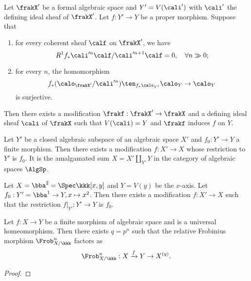     \begin{theorem}\label{thm:Artin_higher_direct_image_and_modification}
        Let \(\frakX'\) be a formal algebraic space and \(Y' = V(\cali')\) with \(\cali'\) the defining ideal sheaf of \(\frakX'\).
        Let \(f:Y' \to Y\) be a proper morphism.
        Suppose that 
        \begin{enumerate}
            \item for every coherent sheaf \(\calf\) on \(\frakX'\), we have 
                \[ R^1f_* \cali'^n\calf/\cali'^{n+1}\calf = 0, \quad \forall n \gg 0; \]
            \item for every \(n\), the homomorphism 
                \[ f_*(\calo_{\frakX'} / \cali'^{n})\ten_{f_*\calo_{Y'}} \calo_Y \to \calo_Y \]
                is surjective.
        \end{enumerate}
        Then there exists a modification \(\frakf: \frakX' \to \frakX\) and a defining ideal sheaf \(\cali\) of \(\frakX\) such that \(V(\cali) = Y\) and \(\frakf\) induces \(f\) on \(Y\).
    \end{theorem}

    \begin{theorem}\label{thm:finite_modification}
        Let \(Y'\) be a closed algebraic subspace of an algebraic space \(X'\) and \(f_0:Y' \to Y\) a finite morphism.
        Then there exists a modification \(f:X' \to X\) whose restriction to \(Y'\) is \(f_0\).
        It is the amalgamated sum \(X = X' \amalg_{Y'} Y\) in the category of algebraic spaces \(\AlgSp\).
    \end{theorem}

    \begin{example}\label{eg:finite_modification_of_line_in_plane}
        Let \(X = \bba^2 = \Spec \kkk[x,y]\) and \(Y = V(y)\) be the \(x\)-axis.
        Let \(f_0:Y'=\bba^1 \to Y, x \mapsto x^2\).
        Then there exists a modification \(f:X' \to X\) such that the restriction \(f|_{Y'}: Y' \to Y\) is \(f_0\).
    \end{example}

    \begin{lemma}\label{lem:relative_frob_factors_through_universal_homeomorphism}
        Let \(f: X \to Y\) be a finite morphism of algebraic space and is a universal homeomorphism.
        Then there exists \(q= p^n\) such that the relative Frobinius morphism \(\Frob_{X/\kkk}^n\) factors as 
        \[ \Frob_{X/\kkk}^n: X \xrightarrow{f} Y \to X^{(q)}. \]
    \end{lemma}
    \begin{proof}
    \end{proof}

